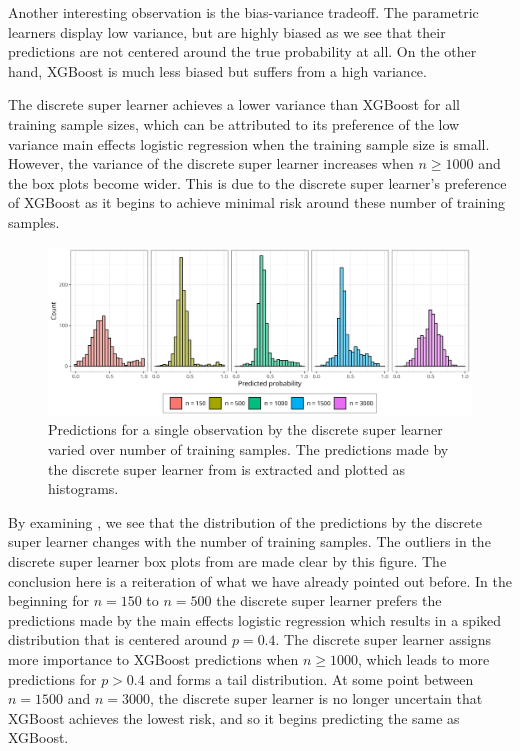 \documentclass[./main.tex]{subfiles}
\begin{document}
Another interesting observation is the bias-variance tradeoff. The parametric learners display low variance, but are highly biased as we see that their predictions are not centered around the true probability at all. On the other hand, XGBoost is much less biased but suffers from a high variance.

The discrete super learner achieves a lower variance than XGBoost for all training sample sizes, which can be attributed to its preference of the low variance main effects logistic regression when the training sample size is small. However, the variance of the discrete super learner increases when $ n \geq 1000 $ and the box plots become wider. This is due to the discrete super learner's preference of XGBoost as it begins to achieve minimal risk around these number of training samples. 

\begin{figure}[H]
    \centering
    \includegraphics[width=\textwidth]{figures/preds_dsl_shift.png}
    \caption{Predictions for a single observation by the discrete super learner varied over number of training samples. The predictions made by the discrete super learner from  is extracted and plotted as histograms.}
    \label{fig:dsl_shift}
\end{figure}
By examining , we see that the distribution of the predictions by the discrete super learner changes with the number of training samples. The outliers in the discrete super learner box plots from  are made clear by this figure. The conclusion here is a reiteration of what we have already pointed out before. In the beginning for $ n = 150 $ to $ n = 500 $ the discrete super learner prefers the predictions made by the main effects logistic regression which results in a spiked distribution that is centered around $ p = 0.4 $. The discrete super learner assigns more importance to XGBoost predictions when $n \geq 1000$, which leads to more predictions for $p > 0.4$ and forms a tail distribution. At some point between $ n = 1500 $ and $ n = 3000 $, the discrete super learner is no longer uncertain that XGBoost achieves the lowest risk, and so it begins predicting the same as XGBoost. 
\end{document}
